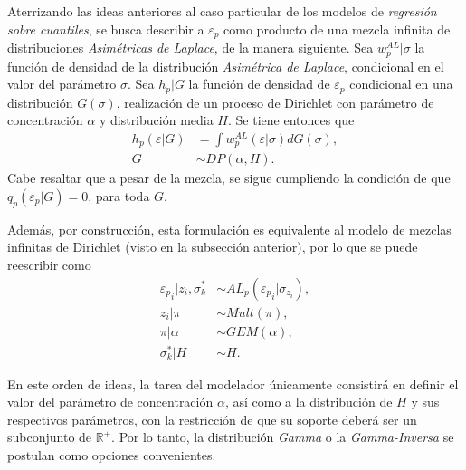 Aterrizando las ideas anteriores al caso particular de los modelos de \textit{regresi\'on sobre cuantiles}, se busca describir a $\varepsilon_p$ como producto de una mezcla infinita de distribuciones \textit{Asim\'etricas de Laplace}, de la manera siguiente. Sea $w_p^{AL} | \sigma$ la funci\'on de densidad de la distribuci\'on \textit{Asim\'etrica de Laplace}, condicional en el valor del par\'ametro $\sigma$. Sea $h_p|G$ la funci\'on de densidad de $\varepsilon_p$ condicional en una distribuci\'on $G(\sigma)$, realizaci\'on de un proceso de Dirichlet con par\'ametro de concentraci\'on $\alpha$ y distribuci\'on media $H$. Se tiene entonces que
\begin{equation*}
\begin{aligned}
    h_p(\varepsilon|G) &= \int w_p^{AL}(\varepsilon|\sigma)dG(\sigma), \\
    G &\sim DP(\alpha,H).
\end{aligned}
\end{equation*}
Cabe resaltar que a pesar de la mezcla, se sigue cumpliendo la condici\'on de que $q_p(\varepsilon_p|G) = 0$, para toda $G$.

Adem\'as, por construcci\'on, esta formulaci\'on es equivalente al modelo de mezclas infinitas de Dirichlet (visto en la subsecci\'on anterior), por lo que se puede reescribir como
\begin{equation*}
\begin{aligned}
   {\varepsilon_p}_i | z_i, \sigma_k^* &\sim AL_p({\varepsilon_p}_i | \sigma_{z_i}), \\
   z_i | \pi &\sim Mult(\pi), \\
   \pi | \alpha &\sim GEM(\alpha), \\
   \sigma_k^* | H &\sim H.
\end{aligned}
\end{equation*}

En este orden de ideas, la tarea del modelador \'unicamente consistir\'a en definir el valor del par\'ametro de concentraci\'on $\alpha$, as\'i como a la distribuci\'on de $H$ y sus respectivos par\'ametros, con la restricci\'on de que su soporte deber\'a ser un subconjunto de $\mathbb{R}^+$. Por lo tanto, la distribuci\'on \textit{Gamma} o la \textit{Gamma-Inversa} se postulan como opciones convenientes.

\newpage